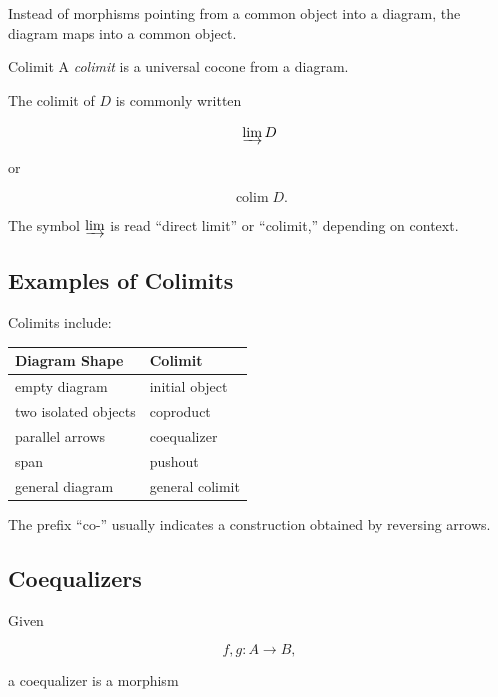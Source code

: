 Instead of morphisms pointing from a common object into a diagram, the
diagram maps into a common object.

\begin{definitionbox}{Colimit}
A \emph{colimit} is a universal cocone from a diagram.
\end{definitionbox}

The colimit of \(D\) is commonly written

\[ \varinjlim D \]

or

\[ \operatorname{colim}D. \]

The symbol \(\varinjlim\) is read ``direct limit'' or ``colimit,'' depending
on context.

\subsection{Examples of Colimits}
\label{subsec:examples-colimits}

Colimits include:

\begin{center}
\begin{tabularx}{0.9\textwidth}{@{}lX@{}}
\toprule
\textbf{Diagram Shape} & \textbf{Colimit}\\
\midrule
empty diagram & initial object\\
two isolated objects & coproduct\\
parallel arrows & coequalizer\\
span & pushout\\
general diagram & general colimit\\
\bottomrule
\end{tabularx}
\end{center}

The prefix ``co-'' usually indicates a construction obtained by reversing
arrows.

\subsection{Coequalizers}
\label{subsec:coequalizers}

Given

\[ f,g:A\to B, \]

a coequalizer is a morphism

